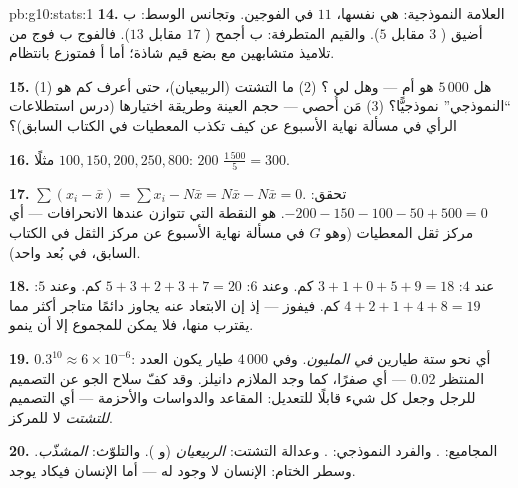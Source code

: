 \begin{solution}{pb:g10:stats:1}
\textbf{14.} العلامة النموذجية: هي نفسها،  $11$ في الفوجين.
وتجانس الوسط: ب أضيق ( $3$ مقابل $5$).
والقيم المتطرفة: ب أجمح ( $17$ مقابل $13$). فالفوج ب فوج من
تلاميذ متشابهين مع بضع قيم شاذة؛ أما أ فمتوزع بانتظام.

\textbf{15.} (1) هل $5\,000$ هو  أم  --- وهل
لي ؟ (2) ما التشتت (الربيعيان)، حتى
أعرف كم هو ``النموذجي'' نموذجيًّا؟ (3) مَن أُحصي --- حجم العينة
وطريقة اختيارها (درس استطلاعات الرأي في مسألة نهاية الأسبوع عن كيف تكذب المعطيات في الكتاب السابق)؟

\textbf{16.} مثلًا $100, 150, 200, 250, 800$: 
$200$  $\frac{1\,500}{5} = 300$.

\textbf{17.} $\sum (x_i - \bar x) = \sum x_i - N \bar x =
N\bar x - N\bar x = 0$. تحقق: $-200 - 150 - 100 - 50 + 500 =
0$.  هو النقطة التي تتوازن عندها الانحرافات --- أي
مركز ثقل المعطيات (وهو $G$ في مسألة نهاية الأسبوع عن مركز الثقل في الكتاب السابق، في
بُعد واحد).

\textbf{18.} عند  $4$: $3 + 1 + 0 + 5 + 9 = 18$ كم. وعند
 $6$: $5 + 3 + 2 + 3 + 7 = 20$ كم. وعند $5$:
$4 + 2 + 1 + 4 + 8 = 19$ كم. فيفوز  --- إذ إن الابتعاد
عنه يجاوز دائمًا متاجر أكثر مما يقترب منها، فلا يمكن
للمجموع إلا أن ينمو.

\textbf{19.} $0.3^{10} \approx 6 \times 10^{-6}$: أي نحو ستة
طيارين \emph{في المليون}. وفي $4\,000$ طيار يكون العدد المنتظر
$0.02$ --- أي صفرًا، كما وجد الملازم دانيلز. وقد كفّ سلاح
الجو عن التصميم للرجل  وجعل
كل شيء قابلًا للتعديل: المقاعد والدواسات والأحزمة --- أي التصميم
\emph{للتشتت} لا للمركز.

\textbf{20.} المجاميع: \emph{}. والفرد النموذجي:
\emph{}. وعدالة التشتت: \emph{الربيعيان} (و
). والتلوّث: \emph{ المشذّب}. وسطر
الختام: الإنسان  لا وجود له --- أما الإنسان 
فيكاد يوجد.
\end{solution}
